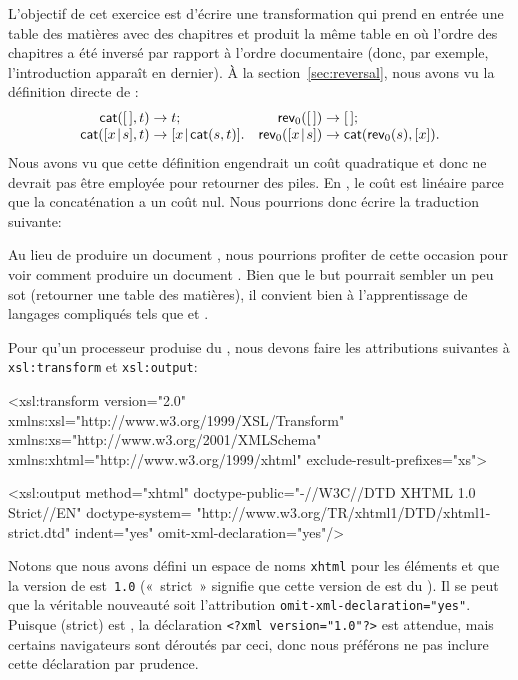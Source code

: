 
L'objectif de cet exercice est d'écrire une transformation \XSLT qui
prend en entrée une table des matières avec des chapitres et produit
la même table en \XML où l'ordre des chapitres a été inversé par
rapport à l'ordre documentaire (donc, par exemple, l'introduction
apparaît en dernier). À la section~\vref{sec:reversal}, nous avons vu
la définition directe de :
\begin{equation*}
\begin{array}{@{}r@{\;}l@{\;}lr@{\;}l@{\;}l@{}}
  \fun{cat}(\el,t)\index{cat@\fun{cat/2}}
& \rightarrow & t;
& \fun{rev}_0(\el)
& \rightarrow & \el;\\
  \fun{cat}(\cons{x}{s},t)
& \rightarrow & \cons{x}{\fun{cat}(s,t)}.
& \fun{rev}_0(\cons{x}{s})
& \rightarrow & \fun{cat}(\fun{rev}_0(s),[x]).
\end{array}
\end{equation*}
Nous avons vu que cette définition engendrait un coût quadratique et
donc ne devrait pas être employée pour retourner des piles. En \XSLT,
le coût est linéaire parce que la concaténation a un coût nul. Nous
pourrions donc écrire la traduction suivante:
Au lieu de produire un document \XML, nous pourrions profiter de cette
occasion pour voir comment produire un document \XHTML. Bien que le
but pourrait sembler un peu sot (retourner une table des matières), il
convient bien à l'apprentissage de langages compliqués tels que \XSLT
et \XHTML.

Pour qu'un processeur \XSLT produise du \XHTML, nous devons faire les
attributions suivantes à \texttt{xsl:transform} et
\texttt{xsl:output}:
\begin{sverb}
<xsl:transform version="2.0"
               xmlns:xsl="http://www.w3.org/1999/XSL/Transform"
               xmlns:xs="http://www.w3.org/2001/XMLSchema"
               xmlns:xhtml="http://www.w3.org/1999/xhtml"
               exclude-result-prefixes="xs">

  <xsl:output method="xhtml"
              doctype-public="-//W3C//DTD XHTML 1.0 Strict//EN"
              doctype-system=
              "http://www.w3.org/TR/xhtml1/DTD/xhtml1-strict.dtd"
              indent="yes"
              omit-xml-declaration="yes"/>
\end{sverb}
Notons que nous avons défini un espace de noms \texttt{xhtml} pour les
éléments \XHTML et que la version de \XHTML est~\texttt{1.0} («~strict~»
signifie que cette version de \XHTML est du \XML). Il se peut que la
véritable nouveauté soit l'attribution
\texttt{omit-xml-declaration="yes"}\!. Puisque \XHTML (strict) est
\XML, la déclaration \texttt{<?xml version="1.0"?>} est attendue, mais
certains navigateurs sont déroutés par ceci, donc nous préférons ne
pas inclure cette déclaration par prudence.

